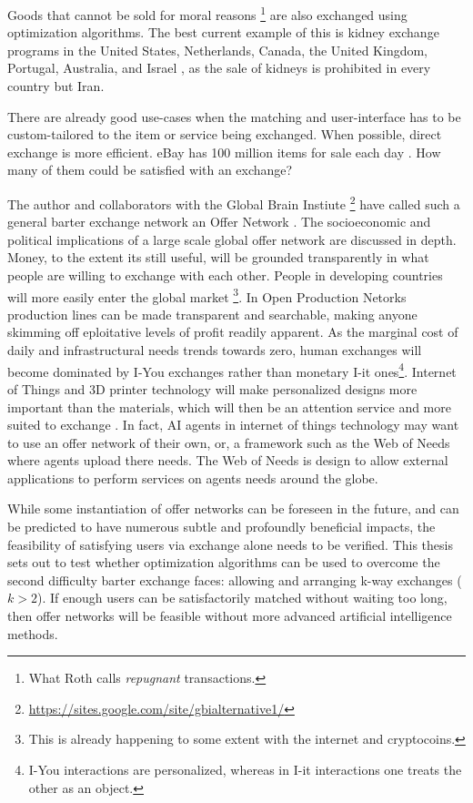 \documentclass[main.tex]{subfiles}
\begin{document}
Goods that cannot be sold for moral reasons \footnote{What Roth calls \textit{repugnant} transactions.}\cite{Rot3} are also exchanged using optimization algorithms. The best current example of this is kidney exchange programs in the United States, Netherlands, Canada, the
United Kingdom, Portugal, Australia, and Israel \cite{Dick}, as the sale of kidneys is prohibited in every country but Iran.

There are already good use-cases when the matching and user-interface has to be custom-tailored to the item or service being exchanged. When possible, direct exchange is more efficient. eBay has 100 million items for sale each day \cite{ebay}. How many of them could be satisfied with an exchange?

The author and collaborators with the Global Brain Instiute \footnote{\url{https://sites.google.com/site/gbialternative1/}} have called such a general barter exchange network an Offer Network \cite{Goe1} \cite{Goe2} \cite{Hey1} \cite{Hey2}. The socioeconomic and political implications of a large scale global offer network are discussed in depth. Money, to the extent its still useful, will be grounded transparently in what people are willing to exchange with each other. People in developing countries will more easily enter the global market \footnote{This is already happening to some extent with the internet and cryptocoins.}. In Open Production Netorks \cite{Goe1} production lines can be made transparent and searchable, making anyone skimming off eploitative levels of profit readily apparent. As the marginal cost of daily and infrastructural needs trends towards zero, human exchanges will become dominated by I-You exchanges rather than monetary I-it ones\footnote{I-You interactions are personalized, whereas in I-it interactions one treats the other as an object.}. Internet of Things and 3D printer technology will make personalized designs more important than the materials, which will then be an attention service and more suited to exchange \cite{Hey1}. In fact, AI agents in internet of things technology may want to use an offer network of their own, or, a framework such as the Web of Needs \cite{Kle1} where agents upload there needs. The Web of Needs is design to allow external applications to perform services on agents needs around the globe.

While some instantiation of offer networks can be foreseen in the future, and can be predicted to have numerous subtle and profoundly beneficial impacts, the feasibility of satisfying users via exchange alone needs to be verified. This thesis sets out to test whether optimization algorithms can be used to overcome the second difficulty barter exchange faces: allowing and arranging k-way exchanges ($k>2$). If enough users can be satisfactorily matched without waiting too long, then offer networks will be feasible without more advanced artificial intelligence methods.
\end{document}

